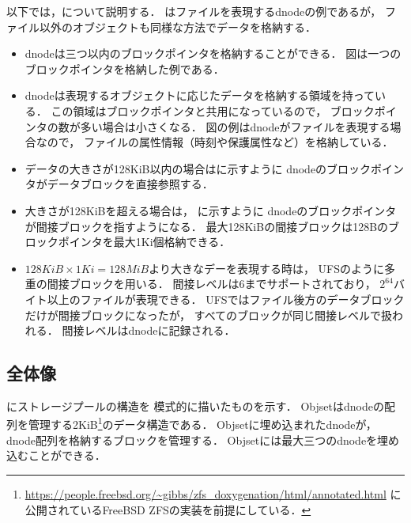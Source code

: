 以下では，について説明する．
はファイルを表現するdnodeの例であるが，
ファイル以外のオブジェクトも同様な方法でデータを格納する．

\begin{itemize}
\item dnodeは三つ以内のブロックポインタを格納することができる．
  図は一つのブロックポインタを格納した例である．
\item dnodeは表現するオブジェクトに応じたデータを格納する領域を持っている．
  この領域はブロックポインタと共用になっているので，
  ブロックポインタの数が多い場合は小さくなる．
  図の例はdnodeがファイルを表現する場合なので，
  ファイルの属性情報（時刻や保護属性など）を格納している．
\item データの大きさが128KiB以内の場合はに示すように
  dnodeのブロックポインタがデータブロックを直接参照する．
\item 大きさが128KiBを超える場合は，
  に示すように
  dnodeのブロックポインタが間接ブロックを指すようになる．
  最大128KiBの間接ブロックは128Bのブロックポインタを最大1Ki個格納できる．
\item $128KiB \times 1Ki = 128MiB$より大きなデーを表現する時は，
  UFSのように多重の間接ブロックを用いる．
  間接レベルは6までサポートされており，
  $2^{64}$バイト以上のファイルが表現できる．
  UFSではファイル後方のデータブロックだけが間接ブロックになったが，
  すべてのブロックが同じ間接レベルで扱われる．
  間接レベルはdnodeに記録される．
\end{itemize}

\subsection{全体像}
にストレージプールの構造を
模式的に描いたものを示す．
Objsetはdnodeの配列を管理する2KiB\footnote{
\url{https://people.freebsd.org/~gibbs/zfs_doxygenation/html/annotated.html}
に公開されているFreeBSD ZFSの実装を前提にしている．
}のデータ構造である．
Objsetに埋め込まれたdnodeが，dnode配列を格納するブロックを管理する．
Objsetには最大三つのdnodeを埋め込むことができる．

